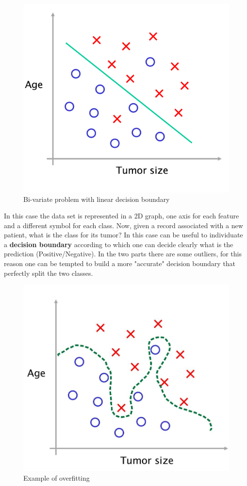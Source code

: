 \begin{figure}[h]
    \centering
    \includegraphics[scale=0.5]{img/tumor_more.png}
    \caption{Bi-variate problem with linear decision boundary}
\end{figure}

In this case the data set is represented in a 2D graph, one axis for each feature and a different symbol for each class. Now, given a record associated with a new patient, what is the class for its tumor? In this case can be useful to individuate a \textbf{decision boundary} according to which one can decide clearly what is the prediction (Positive/Negative). In the two parts there are some outliers, for this reason one can be tempted to build a more "accurate" decision boundary that perfectly split the two classes.

\begin{figure}[h]
    \centering
    \includegraphics[scale=0.2]{img/overfit.jpeg}
    \caption{Example of overfitting}
\end{figure}


